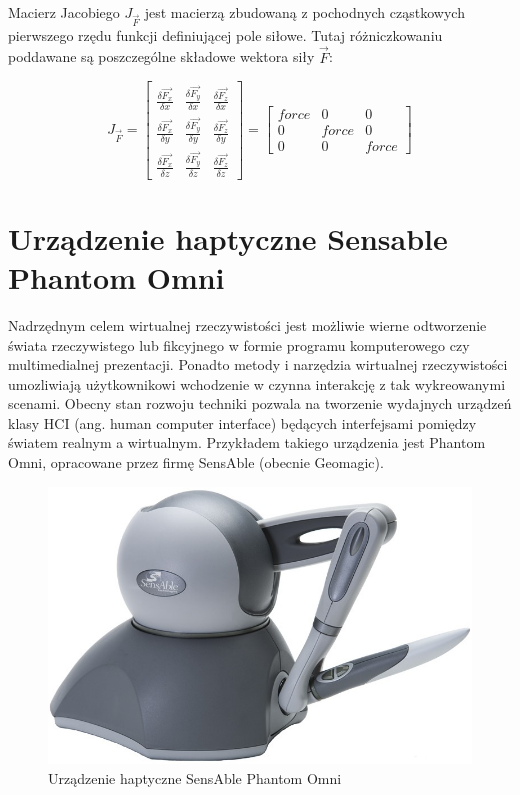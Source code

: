 \documentclass[licencjacka]{pracamgr}
\begin{document}
Macierz Jacobiego $J_{\vec{F}}$ jest macierzą zbudowaną z pochodnych cząstkowych pierwszego rzędu funkcji definiującej pole siłowe. Tutaj różniczkowaniu poddawane są poszczególne składowe wektora siły $\vec{F}$:

$$
J_{\vec{F}}=
\begin{bmatrix}
\frac{\delta \vec{F_x}}{\delta x} & \frac{\delta \vec{F_y}}{\delta x} & \frac{\delta \vec{F_z}}{\delta x} \\
\frac{\delta \vec{F_x}}{\delta y} & \frac{\delta \vec{F_y}}{\delta y} & \frac{\delta \vec{F_z}}{\delta y} \\
\frac{\delta \vec{F_x}}{\delta z} & \frac{\delta \vec{F_y}}{\delta z} & \frac{\delta \vec{F_z}}{\delta z}
\end{bmatrix}
=
\begin{bmatrix}
force & 0 & 0 \\
0 & force & 0 \\
0 & 0 & force
\end{bmatrix}
$$
	
\chapter{Urządzenie haptyczne Sensable Phantom Omni}
Nadrzędnym celem wirtualnej rzeczywistości jest możliwie wierne odtworzenie świata rzeczywistego lub fikcyjnego w formie programu komputerowego czy multimedialnej prezentacji. Ponadto metody i narzędzia wirtualnej rzeczywistości umozliwiają użytkownikowi wchodzenie w czynna interakcję z tak wykreowanymi scenami. Obecny stan rozwoju techniki pozwala na tworzenie wydajnych urządzeń klasy HCI (ang. human computer interface) będących interfejsami pomiędzy światem realnym a wirtualnym. Przykładem takiego urządzenia jest Phantom Omni, opracowane przez firmę SensAble (obecnie Geomagic). 

\begin{figure}[H]
\centering
\includegraphics[scale=0.5,center]{Sensable_Phantom_Omni}
\caption{Urządzenie haptyczne SensAble Phantom Omni}
\end{figure}
\end{document}
